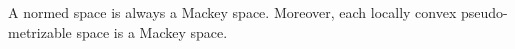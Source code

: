A normed space is always a Mackey space. Moreover, each locally convex pseudo-metrizable space is a Mackey space.
